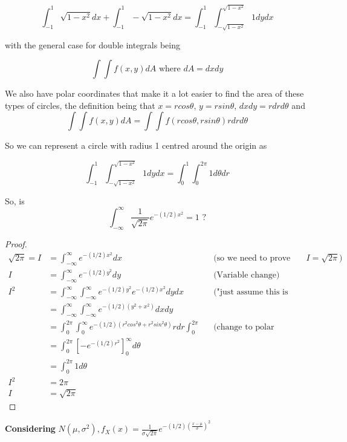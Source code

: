 \documentclass[12pt]{article}
\begin{document}
\begin{enumerate}
{\begin{tcolorbox}[colback=red!5!white,colframe=red!75!black,title= Multivariable Calculus and Polar Coordinates Crash Course]
	$$\int^{1}_{-1} \sqrt{1 - x^2} dx + \int^{1}_{-1} -\sqrt{1 - x^2} dx = \int^{1}_{-1} \int^{\sqrt{1 - x^2}}_{-\sqrt{1 - x^2}}1 dy dx$$

	with the general case for double integrals being
	
	$$\int\int f(x,y) dA \text{ where } dA = dxdy$$
	
	We also have polar coordinates that make it a lot easier to find the area of these types of circles, the definition being that $x = rcos\theta$, $y = rsin\theta$, $dxdy = rdrd\theta$ and
	$$\int\int f(x,y) dA = \int\int f(rcos\theta, rsin\theta) rdrd\theta$$
	
	So we can represent a circle with radius 1 centred around the origin as
	
	$$\int^{1}_{-1} \int^{\sqrt{1 - x^2}}_{-\sqrt{1 - x^2}}1 dy dx = \int^{1}_{0}\int^{2\pi}_{0} 1 d\theta dr$$
	
	\end{tcolorbox}
	
	So, is $$\int^{\infty}_{-\infty} \frac{1}{\sqrt{2\pi}} e^{-(1/2)x^2} = 1 \text{ ?}$$
	
	\begin{proof}
		\begin{align*}
			 \sqrt{2\pi} = I &= \int^{\infty}_{-\infty} e^{-(1/2)x^2} dx  && \text{(so we need to prove that $I = \sqrt{2\pi}$)}\\
			I &= \int^{\infty}_{-\infty} e^{-(1/2)y^2} dy  && \text{(Variable change)}\\
			I^2 &= \int^{\infty}_{-\infty} \int^{\infty}_{-\infty} e^{-(1/2)y^2} e^{-(1/2)x^2} dy dx && \text{("just assume this is true" - Mahinda)}\\
			&= \int^{\infty}_{-\infty} \int^{\infty}_{-\infty} e^{-(1/2)(y^2 + x^2)} dx dy\\
			&= \int^{2\pi}_{0} \int^{\infty}_{0} e^{-(1/2)(r^2 cos^2 \theta + r^2 sin^2 \theta)} r dr \int^{2\pi}_{0} && \text{(change to polar coordinates)}\\
			&=\int^{2\pi}_{0} [-e^{-(1/2)r^2}]^{\infty}_{0} d\theta\\
			&=\int^{2\pi}_{0} 1 d\theta\\
			I^2 &= 2\pi\\
			I &= \sqrt{2\pi}
		\end{align*}
	\end{proof}

	\textbf{Considering} $N(\mu, \sigma^2), f_X (x) = \frac{1}{\sigma \sqrt{2\pi}} e^{-(1/2)(\frac{x - \mu}{\sigma})^2}$
	
}
\end{enumerate}
\end{document}
